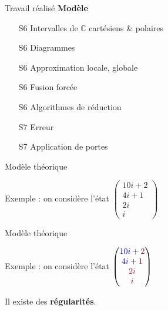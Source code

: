 \begin{frame}{Travail réalisé}
  \textbf{Modèle}
  \begin{itemize}
      \item[S6] Intervalles de $\mathbb C$ cartésiens \& polaires
      \item[S6] Diagrammes
      \item[S6] Approximation locale, globale
      \item[S6] Fusion forcée
      \item[S6] Algorithmes de réduction
      \item[S7] Erreur
      \item[S7] Application de portes
  \end{itemize}
\end{frame}

\begin{frame}{Modèle théorique}

  Exemple : on considère l'état $\begin{pmatrix}
    10i+2 \\ 4i+1 \\ 2i \\ i
  \end{pmatrix}$

  \vspace{2em}

\end{frame}

\begin{frame}[noframenumbering]{Modèle théorique} %

  Exemple : on considère l'état $\begin{pmatrix}
  \color{blue}10i \color{black} + \color{cs} 2 \\
  \color{blue}4i  \color{black} + \color{cs} 1 \\
  \color{cs}  2i \\
  \color{cs}  i
  \end{pmatrix}$

  \vspace{1em}
  Il existe des \textbf{régularités}.
\end{frame}

